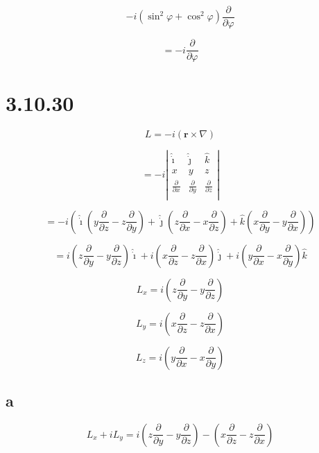 \documentclass[12pt]{article}
\begin{document}
\[
    - i \left(\sin^2{\varphi} + \cos^2{\varphi} \right) \frac{\partial}{\partial \varphi}
\]

\[
    = - i \frac{\partial}{\partial \varphi}
\]

\section{3.10.30}

\[
    L = -i \left(\textbf{r} \times \nabla\right)
\]

\[
    = -i \left\lvert \begin{array}{ccc}
        \hat{\dot{\imath}}          & \hat{\dot{\jmath}}          & \hat{k}                     \\
        x                           & y                           & z                           \\
        \frac{\partial}{\partial x} & \frac{\partial}{\partial y} & \frac{\partial}{\partial z} \\
    \end{array} \right\rvert
\]

\[
    = -i \left(\hat{\dot{\imath}} \left(y \frac{\partial}{\partial z} - z \frac{\partial}{\partial y}\right) + \hat{\dot{\jmath}} \left(z \frac{\partial}{\partial x} - x \frac{\partial}{\partial z}\right) + \hat{k} \left(x \frac{\partial}{\partial y} - y \frac{\partial}{\partial x}\right)\right)
\]

\[
    = i \left(z \frac{\partial}{\partial y} - y \frac{\partial}{\partial z}\right) \hat{\dot{\imath}} + i \left(x \frac{\partial}{\partial z} - z \frac{\partial}{\partial x}\right) \hat{\dot{\jmath}} + i \left(y \frac{\partial}{\partial x} - x \frac{\partial}{\partial y}\right) \hat{k}
\]

\[
    L_x = i \left(z \frac{\partial}{\partial y} - y \frac{\partial}{\partial z}\right)
\]

\[
    L_y = i \left(x \frac{\partial}{\partial z} - z \frac{\partial}{\partial x}\right)
\]

\[
    L_z = i \left(y \frac{\partial}{\partial x} - x \frac{\partial}{\partial y}\right)
\]

\subsection{a}

\[
    L_x + i L_y = i \left(z \frac{\partial}{\partial y} - y \frac{\partial}{\partial z}\right) - \left(x \frac{\partial}{\partial z} - z \frac{\partial}{\partial x}\right)
\]
\end{document}

